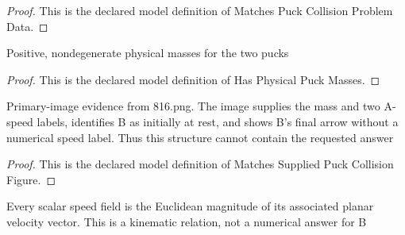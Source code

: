 \begin{proof}
  This is the declared model definition of Matches Puck Collision Problem Data.
\end{proof}
\begin{definition}
  \label{def:physics:phyx-mini-0816:phyxminiproblems-problemphyxmini0816-hasphysicalpuckmasses}
  Positive, nondegenerate physical masses for the two pucks
\end{definition}
\begin{proof}
  This is the declared model definition of Has Physical Puck Masses.
\end{proof}
\begin{definition}
  \label{def:physics:phyx-mini-0816:phyxminiproblems-problemphyxmini0816-matchessuppliedpuckcollisionfigure}
  Primary-image evidence from 816.png. The image supplies the mass and two A-speed labels, identifies B as initially at rest, and shows B's final arrow without a numerical speed label. Thus this structure cannot contain the requested answer
\end{definition}
\begin{proof}
  This is the declared model definition of Matches Supplied Puck Collision Figure.
\end{proof}
\begin{definition}
  \label{def:physics:phyx-mini-0816:phyxminiproblems-problemphyxmini0816-hasvelocitymagnitudekinematics}
  Every scalar speed field is the Euclidean magnitude of its associated planar velocity vector. This is a kinematic relation, not a numerical answer for B
\end{definition}
